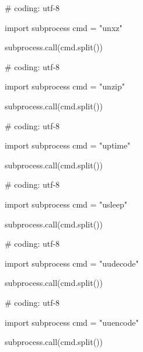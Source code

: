 \begin{mylisting}[label={lst:acpid},language=sh,caption=unxz]

# coding: utf-8

import subprocess
cmd = "unxz"

subprocess.call(cmd.split())

\end{mylisting}

\begin{mylisting}[label={lst:acpid},language=sh,caption=unzip]

# coding: utf-8

import subprocess
cmd = "unzip"

subprocess.call(cmd.split())

\end{mylisting}

\begin{mylisting}[label={lst:acpid},language=sh,caption=uptime]

# coding: utf-8

import subprocess
cmd = "uptime"

subprocess.call(cmd.split())

\end{mylisting}

\begin{mylisting}[label={lst:acpid},language=sh,caption=usleep]

# coding: utf-8

import subprocess
cmd = "usleep"

subprocess.call(cmd.split())

\end{mylisting}

\begin{mylisting}[label={lst:acpid},language=sh,caption=uudecode]

# coding: utf-8

import subprocess
cmd = "uudecode"

subprocess.call(cmd.split())

\end{mylisting}

\begin{mylisting}[label={lst:acpid},language=sh,caption=uuencode]

# coding: utf-8

import subprocess
cmd = "uuencode"

subprocess.call(cmd.split())

\end{mylisting}

